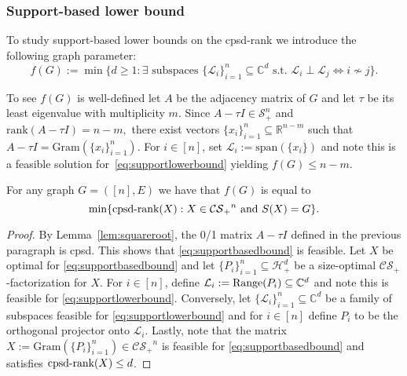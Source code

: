 \documentclass{siamart}
\begin{document}
{{{\subsubsection{Support-based lower bound}\label{sec:supprotlowerbound}

To study  support-based lower bounds on the cpsd-rank we introduce
the following graph parameter: \begin{equation}\label{eq:supportlowerbound}
f(G):=\min \{ d\ge 1:\exists   \text{ subspaces }
\{{\mathcal{L}}_i\}_{i=1}^n\subseteq {\mathbb{C}}^d \text{ s.t. } {\mathcal{L}}_i\perp {\mathcal{L}}_j
\Longleftrightarrow i\not \sim j \}. \end{equation}

To see $f(G)$  is well-defined let $A$ be the adjacency matrix of $G$ and  let $\tau$ be its least eigenvalue with multiplicity $m$. Since  $A-\tau I\in {\mathcal{S}}^n_+$ and  ${\mathrm{rank}}(A-\tau I )= n-m,$  there exist   vectors $\{x_i\}_{i=1}^n\subseteq {\mathbb{R}}^{n-m}$     such that $A-\tau I={\mathrm{Gram}}(\{x_i\}_{i=1}^n)$. For $i\in [n]$, set   ${\mathcal{L}}_i:={\mathrm{span}}({\{ x_i \}})$ and note this is  a feasible solution for~\eqref{eq:supportlowerbound} yielding $f(G) \leq n-m$.

\medskip 

\begin{theorem}\label{prop:supportlowerbound}
For any graph  $G=([n],E)$ we have that $f(G)$ is equal to
\begin{equation}\label{eq:supportbasedbound}
 \min \{{\mathrm{cpsd}\textnormal{-rank}}(X): X\in{\mathcal{CS}_+}^n \text{ and }S(X)=G   \}.
\end{equation}
\end{theorem}

\begin{proof}
By Lemma~\ref{lem:squareroot}, the   0/1  matrix $A-\tau I$  defined in the previous paragraph is cpsd. This shows that \eqref{eq:supportbasedbound} is feasible.  Let  $X$ be optimal  for  \eqref{eq:supportbasedbound}  and let {$\{P_i\}_{i=1}^n\subseteq {\mathcal{H}}^d_+$} be a size-optimal  ${\mathcal{CS}_+}$-factorization for $X$. For $i\in [n]$, define  {${\mathcal{L}}_i:={\rm Range}(P_i)\subseteq {\mathbb{C}}^d$} and note this is  feasible for \eqref{eq:supportlowerbound}.
Conversely, let $\{{\mathcal{L}}_i\}_{i=1}^n\subseteq {\mathbb{C}}^d$ be a family of subspaces feasible for \eqref{eq:supportlowerbound} and for $i\in [n]$ define $P_i$ to be the orthogonal projector {onto} ${\mathcal{L}}_i$. Lastly, note that the matrix   $X:={\mathrm{Gram}}(\{P_i\}_{i=1}^n)\in {\mathcal{CS}_+}^n$ is feasible for \eqref{eq:supportbasedbound} and satisfies  ${\mathrm{cpsd}\textnormal{-rank}}(X) \leq d$.
\end{proof}
\vspace{0.1cm} 

}}}
\end{document}
